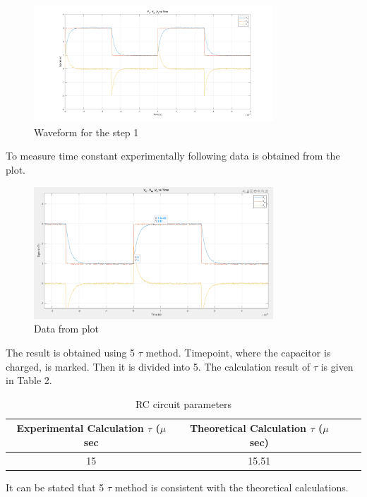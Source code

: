 \documentclass[letterpaper,12pt]{article}
\begin{document}
\begin{figure}[H]
	\centering
   \includegraphics[width=0.8\textwidth]{1a.png}
   \caption{Waveform for the step 1}
\end{figure} 
To measure time constant experimentally following data is obtained from the plot.
\begin{figure}[H]
	\centering
   \includegraphics[width=0.8\textwidth]{1_plot_data.png}
   \caption{Data from plot}
\end{figure} 
The result is obtained using 5 \(\tau\) method. Timepoint, where the capacitor is charged, is marked. Then it is divided into 5. The calculation result of \(\tau\) is given in Table 2.
\begin{table}[H]
	\begin{center}
	\caption{RC circuit parameters}
	\vspace{2mm}
		\begin{tabular}{||c | c | c | c||} 
		 \hline
		 Experimental Calculation \(\tau\) (\(\mu\) sec & Theoretical Calculation \(\tau\) (\(\mu\) sec) \\ [0.5ex] 
		 \hline\hline
		 15 & 15.51 \\ 
		 \hline
	\end{tabular}
	\end{center}
	\end{table}
It can be stated that 5 \(\tau\) method is consistent with the theoretical calculations. \\
\end{document}
